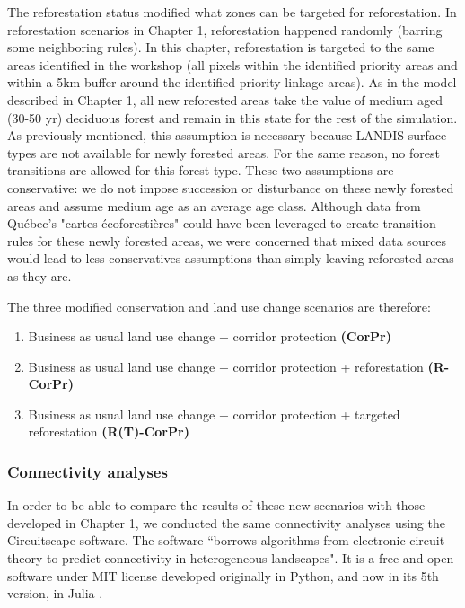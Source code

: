 The reforestation status modified what zones can be targeted for reforestation. In reforestation scenarios in Chapter 1, reforestation happened randomly (barring some neighboring rules). In this chapter, reforestation is targeted to the same areas identified in the workshop (all pixels within the identified priority areas and within a 5km buffer around the identified priority linkage areas). As in the model described in Chapter 1, all new reforested areas take the value of medium aged (30-50 yr) deciduous forest and remain in this state for the rest of the simulation. As previously mentioned, this assumption is necessary because LANDIS surface types are not available for newly forested areas. For the same reason, no forest transitions are allowed for this forest type. These two assumptions are conservative:  we do not impose succession or disturbance on these newly forested areas and assume medium age as an average age class. Although data from Québec's "cartes écoforestières" could have been leveraged to create transition rules for these newly forested areas, we were concerned that mixed data sources would lead to less conservatives assumptions than simply leaving reforested areas as they are. 

The three modified conservation and land use change scenarios are therefore:
\begin{enumerate}
  \item Business as usual land use change + corridor protection \textbf{(CorPr)}
 \item Business as usual land use change + corridor protection + reforestation \textbf{(R-CorPr)}
 \item Business as usual land use change + corridor protection + targeted reforestation \textbf{(R(T)-CorPr)} \\
\end{enumerate}

\subsubsection{Connectivity analyses}

In order to be able to compare the results of these new scenarios with those developed in Chapter 1, we conducted the same connectivity analyses using the Circuitscape software. The software “borrows algorithms from electronic circuit theory to predict connectivity in heterogeneous landscapes". It is a free and open software under MIT license developed originally in Python, and now in its 5th version, in Julia \citep{circuitjulia}.

